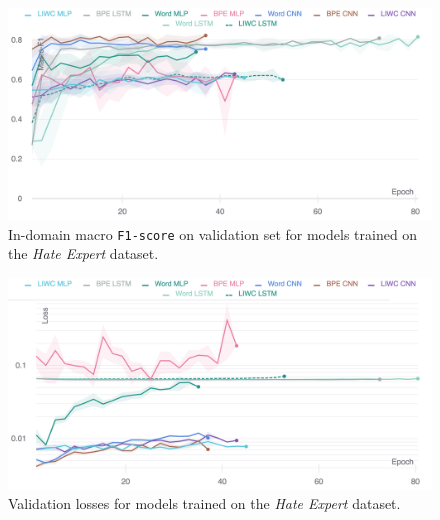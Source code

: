 \begin{figure}
    \centering
    \includegraphics[width=\textwidth]{waseem_dev_f1.pdf}
    \caption{In-domain macro \texttt{F1-score} on validation set for models trained on the \textit{Hate Expert} dataset.}
    \label{fig:waseem_dev_f1}
\end{figure}
\begin{figure}
    \centering
    \includegraphics[width=\textwidth]{waseem_dev_loss_stderr_logscale.pdf}
    \caption{Validation losses for models trained on the \textit{Hate Expert} dataset.}
    \label{fig:waseem_dev_loss}
\end{figure}

